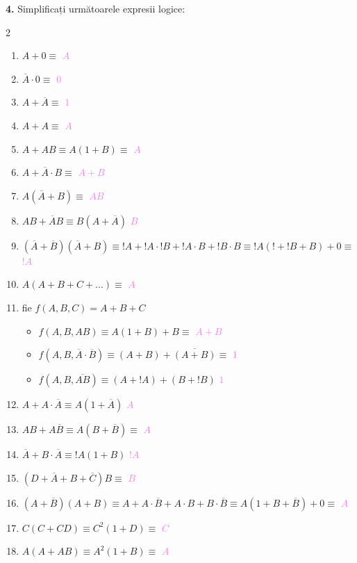 \documentclass[a4paper]{article}
\newcommand{\hl}[1]{\textcolor{violet}{\textit{#1}}}
\begin{document}
\textbf{4.} Simplificați următoarele expresii logice:
\begin{multicols}{2}
\begin{enumerate}[label=(\arabic*)]
    \item $A + 0 \equiv$ \hl{$A$} 
    \item $\overline{A}\cdot 0 \equiv$ \hl{$0$}
    \item $A + \overline{A} \equiv$ \hl{$1$}
    \item $A + A \equiv$ \hl{$A$}
    \item $A + AB \equiv A(1+B) \equiv$ \hl{$A$}
    \item $A + \overline{A}\cdot B \equiv$ \hl{$A + B$}
    \item $A(\overline{A} + B) \equiv$ \hl{$AB$}
    \item $AB + \overline{A}B \equiv B(A + \overline{A})$ \hl{$B$}
    \item $(\overline{A} + \overline{B})(\overline{A} + B) \equiv !A + !A \cdot !B + !A \cdot B + !B \cdot B \equiv !A(! + !B + B) + 0 \equiv$ \hl{$!A$}
    \item $A(A + B + C + ...) \equiv$ \hl{$A$}
    \item fie $f(A, B, C) = A + B + C$
        \begin{itemize}[label=i.*]
            \item $f(A, B, AB) \equiv A(1 + B) + B \equiv$ \hl{$A + B$}
            \item $f(A, B, \overline{A}\cdot\overline{B}) \equiv (A + B) + \overline{(A + B)} \equiv$ \hl{$1$}
            \item $f(A, B, \overline{AB}) \equiv (A + !A) + (B + !B)$ \hl{$1$}
        \end{itemize}
    \item $A + A \cdot \overline{A} \equiv A(1+\overline{A})$ \hl{$A$}
    \item $AB + A\overline{B} \equiv A(B + \overline{B}) \equiv$ \hl{$A$}
    \item $\overline{A} +  B \cdot \overline{A} \equiv !A(1 + B)$ \hl{$!A$}
    \item $(D + \overline{A} + B + \overline{C})B \equiv $ \hl{$B$}
    \item $(A + \overline{B})(A + B) \equiv A + A \cdot \overline{B} + A \cdot B + B \cdot \overline{B} \equiv A(1 + B + \overline{B}) + 0 \equiv $ \hl{$A$}
    \item $C(C + CD) \equiv C^2(1 + D) \equiv$ \hl{$C$}
    \item $A(A + AB) \equiv A^2(1 + B) \equiv$ \hl{$A$}

\end{enumerate}
\end{multicols}
\end{document}
